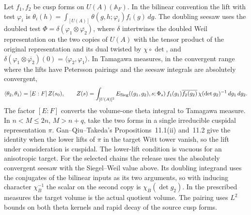 Let \(f_1,f_2\) be cusp forms on \(U(A)(\mathbb A_F)\).
In the bilinear convention the lift with test \(\varphi_i\) is
\(\theta_i(h)=\int_{[U(A)]}\theta(g,h;\varphi_i)f_i(g)\,dg\).
The doubling seesaw uses the doubled test
\(\Phi=\delta(\varphi_1\otimes\overline{\varphi_2})\),
where \(\delta\) intertwines the doubled Weil representation on the
two copies of \(U(A)\) with the tensor product of the original
representation and its dual twisted by \(\chi\circ\det\), and
\(\delta(\varphi_1\otimes\overline{\varphi_2})(0)
=\langle\varphi_2,\varphi_1\rangle\).
In Tamagawa measures, in the convergent range where the lifts have
Petersson pairings and the seesaw integrals are absolutely convergent,
\[
 \langle\theta_2,\theta_1\rangle
   =[E:F]\,Z(s_0),\qquad
 Z(s)=\int_{[U(A)]^2} E_{\rm Sieg}((g_1,g_2),s;\Phi_s)\,
 f_1(g_1)\overline{f_2(g_2)}\,
 \chi(\det g_2)^{-1}\,dg_1\,dg_2 .
\]
The factor \([E:F]\) converts the volume-one theta integral to
Tamagawa measure. In \(n<M\leq 2n\), \(M>n+q\), take the two forms
in a single irreducible cuspidal representation \(\pi\). Gan--Qiu--Takeda's
Propositions~11.1(ii) and~11.2 give the identity when the lower
lifts of \(\pi\) in the target Witt tower vanish, so the lift under
consideration is cuspidal. The lower-lift condition is vacuous for
an anisotropic target.
\cite[\S\S11.3--11.5, Propositions~11.1(ii) and 11.2]{gqt}
For the selected chains the release uses the absolutely convergent
seesaw with the Siegel--Weil value above. Its doubling integrand
uses the conjugates of the bilinear inputs as its two arguments, so
with inducing character \(\chi_B^{-1}\) the scalar on the second
copy is \(\chi_B(\det g_2)\). In the prescribed measures the target
volume is the actual quotient volume. The pairing uses \(L^2\)
bounds on both theta kernels and rapid decay of the source cusp forms.

